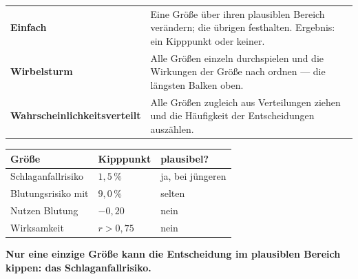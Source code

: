 \begin{merksatz}
\begin{center}
{\small
\renewcommand{\arraystretch}{1.55}
\begin{tabular}{@{}P{2.6cm}P{6.0cm}@{}}
\toprule
\textbf{Einfach} & Eine Größe über ihren plausiblen Bereich verändern; die übrigen festhalten. Ergebnis: ein Kipppunkt oder keiner.\\
\textbf{Wirbelsturm} & Alle Größen einzeln durchspielen und die Wirkungen der Größe nach ordnen --- die längsten Balken oben.\\
\textbf{Wahrscheinlich\-keitsverteilt} & Alle Größen zugleich aus Verteilungen ziehen und die Häufigkeit der Entscheidungen auszählen.\\
\bottomrule
\end{tabular}}
\end{center}

\begin{center}
{\small
\renewcommand{\arraystretch}{1.46}
\begin{tabular}{@{}P{2.8cm}P{2.2cm}P{2.6cm}@{}}
\toprule
\textbf{Größe} & \textbf{Kipppunkt} & \textbf{plausibel?}\\
\midrule
Schlaganfallrisiko & $1{,}5\,\%$ & ja, bei jüngeren\\
Blutungsrisiko mit & $9{,}0\,\%$ & selten\\
Nutzen Blutung & $-0{,}20$ & \textcolor{gruen}{nein}\\
Wirksamkeit & $r > 0{,}75$ & \textcolor{gruen}{nein}\\
\bottomrule
\end{tabular}}
\end{center}

\begin{center}
\begin{minipage}{0.9\textwidth}
\textbf{Nur eine einzige Größe kann die Entscheidung im plausiblen Bereich kippen: das Schlaganfallrisiko.}
\end{minipage}
\end{center}

\begin{center}
\begin{minipage}{0.88\textwidth}
\end{minipage}
\end{center}
\end{merksatz}

